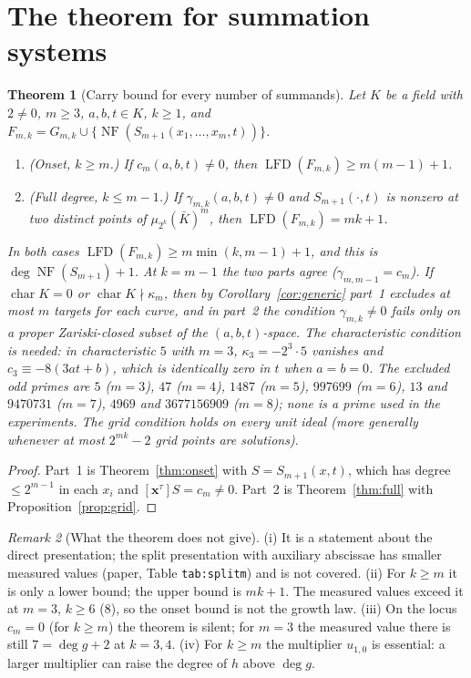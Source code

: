 \documentclass[11pt]{article}
\newcommand{\lfd}{\operatorname{LFD}}
\newcommand{\NF}{\operatorname{NF}}
\newcommand{\code}[1]{\texttt{#1}}
\newtheorem{theorem}{Theorem}
\theoremstyle{definition}
\theoremstyle{remark}
\newtheorem{remark}[theorem]{Remark}
\begin{document}
\section{The theorem for summation systems}
\begin{theorem}[Carry bound for every number of summands]\label{thm:main}
Let $K$ be a field with $2\ne0$, $m\ge3$, $a,b,t\in K$, $k\ge1$, and
$F_{m,k}=G_{m,k}\cup\{\NF(S_{m+1}(x_1,\ldots,x_m,t))\}$.
\begin{enumerate}
\item (Onset, $k\ge m$.) If $c_m(a,b,t)\ne0$, then $\lfd(F_{m,k})\ge m(m-1)+1$.
\item (Full degree, $k\le m-1$.) If $\gamma_{m,k}(a,b,t)\ne0$ and $S_{m+1}(\cdot,t)$ is
nonzero at two distinct points of $\mu_{2^k}(\bar K)^m$, then $\lfd(F_{m,k})=mk+1$.
\end{enumerate}
In both cases $\lfd(F_{m,k})\ge m\min(k,m-1)+1$, and this is
$\deg\NF(S_{m+1})+1$. At $k=m-1$ the two parts agree ($\gamma_{m,m-1}=c_m$).
If $\operatorname{char}K=0$ or $\operatorname{char}K\nmid\kappa_m$, then by
Corollary~\ref{cor:generic} part~1 excludes at most $m$ targets for each
curve, and in part~2 the condition $\gamma_{m,k}\ne0$ fails only on a proper
Zariski-closed subset of the $(a,b,t)$-space. The characteristic condition
is needed: in characteristic $5$ with $m=3$, $\kappa_3=-2^3\cdot5$ vanishes and
$c_3\equiv-8(3at+b)$, which is identically zero in $t$ when $a=b=0$. The
excluded odd primes are $5$ ($m=3$), $47$ ($m=4$), $1487$ ($m=5$), $997699$
($m=6$), $13$ and $9470731$ ($m=7$), $4969$ and $3677156909$ ($m=8$); none is a
prime used in the experiments. The grid condition holds on every unit ideal
(more generally whenever at most $2^{mk}-2$ grid points are solutions).
\end{theorem}
\begin{proof}
Part~1 is Theorem~\ref{thm:onset} with $S=S_{m+1}(x,t)$, which has degree
$\le2^{m-1}$ in each $x_i$ and $[\mathbf x^\tau]S=c_m\ne0$. Part~2 is
Theorem~\ref{thm:full} with Proposition~\ref{prop:grid}.
\end{proof}

\begin{remark}[What the theorem does not give]
(i) It is a statement about the direct presentation; the split presentation
with auxiliary abscissae has smaller measured values (paper,
Table \code{tab:splitm}) and is not covered. (ii) For $k\ge m$ it is only a
lower bound; the upper bound is $mk+1$. The measured values exceed it at
$m=3$, $k\ge6$ ($8$), so the onset bound is not the growth law. (iii) On the
locus $c_m=0$ (for $k\ge m$) the theorem is silent; for $m=3$ the measured value
there is still $7=\deg g+2$ at $k=3,4$. (iv) For $k\ge m$ the multiplier
$u_{1,0}$ is essential: a larger multiplier can raise the degree of $h$
above $\deg g$.
\end{remark}
\end{document}

